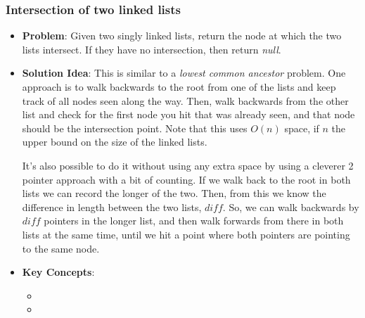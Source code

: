 \documentclass[10pt,a4paper]{article}
\begin{document}
\subsubsection*{Intersection of two linked lists}
\begin{itemize}
\item \textbf{Problem}: Given two singly linked lists, return the node at which the two lists intersect. If they have no intersection, then return \textit{null}.
\item \textbf{Solution Idea}: This is similar to a \textit{lowest common ancestor} problem. One approach is to walk backwards to the root from one of the lists and keep track of all nodes seen along the way. Then, walk backwards from the other list and check for the first node you hit that was already seen, and that node should be the intersection point. Note that this uses $O(n)$ space, if $n$ the upper bound on the size of the linked lists. 

It's also possible to do it without using any extra space by using a cleverer 2 pointer approach with a bit of counting. If we walk back to the root in both lists we can record the longer of the two. Then, from this we know the difference in length between the two lists, $diff$. So, we can walk backwards by $diff$ pointers in the longer list, and then walk forwards from there in both lists at the same time, until we hit a point where both pointers are pointing to the same node.
\item \textbf{Key Concepts}:
\begin{itemize}
    \item {}
    \item {}
\end{itemize}
\end{itemize}
\end{document}
